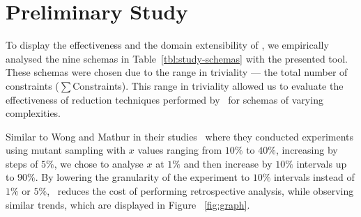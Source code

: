 \section{Preliminary Study}




To display the effectiveness and the domain extensibility of \mr, we empirically analysed the nine schemas in Table~\ref{tbl:study-schemas}
with the presented tool. These schemas were chosen due to the range in triviality --- the total number of constraints ({\small$\sum$Constraints}).
This range in triviality allowed us to evaluate the effectiveness of reduction techniques performed by \mr~for schemas of varying
complexities.

Similar to Wong and Mathur in their studies~\cite{mathur1994empirical, wong1993mutation} where they conducted experiments using
mutant sampling with $x$ values ranging from $10\%$ to $40\%$, increasing by steps of $5\%$, we chose to analyse $x$ at $1\%$ and
then increase by $10\%$ intervals up to $90\%$. By lowering the granularity of the experiment to $10\%$ intervals instead of $1\%$
or $5\%$, \mr~reduces the cost of performing retrospective analysis, while observing similar trends, which are displayed in
Figure ~\ref{fig:graph}.





